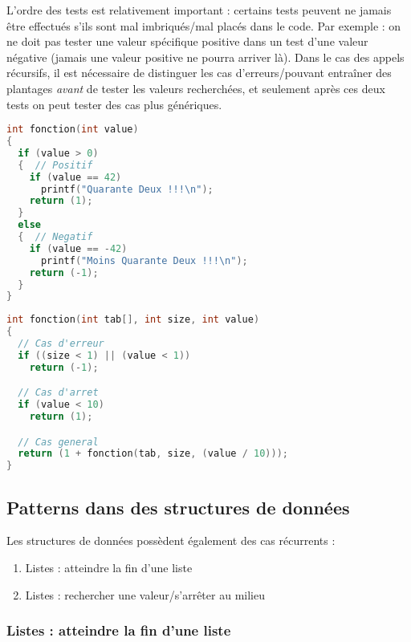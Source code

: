 \documentclass[11pt,a4paper]{article}
\begin{document}
\bigskip

L'ordre des tests est relativement important : certains tests peuvent ne jamais être effectués s'ils sont mal imbriqués/mal placés dans le code.
Par exemple : on ne doit pas tester une valeur spécifique positive dans un test d'une valeur négative (jamais une valeur positive ne pourra arriver là).
Dans le cas des appels récursifs, il est nécessaire de distinguer les cas d'erreurs/pouvant entraîner des plantages \textit{avant} de tester les valeurs recherchées, et seulement après ces deux tests on peut tester des cas plus génériques.

\medskip

\begin{lstlisting}[language=C]
int fonction(int value)
{
  if (value > 0)
  {  // Positif
    if (value == 42)
      printf("Quarante Deux !!!\n");
    return (1);
  }
  else
  {  // Negatif
    if (value == -42)
      printf("Moins Quarante Deux !!!\n");
    return (-1);
  }
} \end{lstlisting}

\begin{lstlisting}[language=C]
int fonction(int tab[], int size, int value)
{
  // Cas d'erreur
  if ((size < 1) || (value < 1))
    return (-1);

  // Cas d'arret
  if (value < 10)
    return (1);

  // Cas general
  return (1 + fonction(tab, size, (value / 10)));
} \end{lstlisting}

\bigskip

\clearpage

\subsection{Patterns dans des structures de données}

Les structures de données possèdent également des cas récurrents :

\begin{enumerate}
\item Listes : atteindre la fin d'une liste
\item Listes : rechercher une valeur/s'arrêter au milieu

\end{enumerate}

\medskip

\subsubsection{Listes : atteindre la fin d'une liste}
\end{document}
